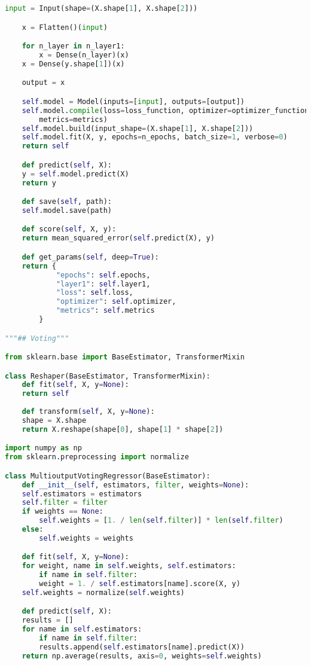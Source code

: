 \begin{lstlisting}[label=python-listing,caption={Kod źródłowy},language=python]
    input = Input(shape=(X.shape[1], X.shape[2]))

    x = Flatten()(input)

    for n_layer in n_layer1:
        x = Dense(n_layer)(x)
    x = Dense(y.shape[1])(x)

    output = x

    self.model = Model(inputs=[input], outputs=[output])
    self.model.compile(loss=loss_function, optimizer=optimizer_function, 
        metrics=metrics) 
    self.model.build(input_shape=(X.shape[1], X.shape[2]))
    self.model.fit(X, y, epochs=n_epochs, batch_size=1, verbose=0)
    return self

    def predict(self, X):
    y = self.model.predict(X)
    return y

    def save(self, path):
    self.model.save(path)

    def score(self, X, y):
    return mean_squared_error(self.predict(X), y)

    def get_params(self, deep=True):
    return {
            "epochs": self.epochs,
            "layer1": self.layer1,
            "loss": self.loss,
            "optimizer": self.optimizer,
            "metrics": self.metrics
        }

"""## Voting"""

from sklearn.base import BaseEstimator, TransformerMixin

class Reshaper(BaseEstimator, TransformerMixin):
    def fit(self, X, y=None):
    return self
    
    def transform(self, X, y=None):
    shape = X.shape
    return X.reshape(shape[0], shape[1] * shape[2])

import numpy as np
from sklearn.preprocessing import normalize

class MultioutputVotingRegressor(BaseEstimator):
    def __init__(self, estimators, filter, weights=None):
    self.estimators = estimators
    self.filter = filter
    if weights == None:
        self.weights = [1. / len(self.filter)] * len(self.filter)
    else:
        self.weights = weights

    def fit(self, X, y=None):
    for weight, name in self.weights, self.estimators:
        if name in self.filter:
        weight = 1. / self.estimators[name].score(X, y)
    self.weights = normalize(self.weights)

    def predict(self, X):
    results = []
    for name in self.estimators:
        if name in self.filter:
        results.append(self.estimators[name].predict(X))
    return np.average(results, axis=0, weights=self.weights)
    

\end{lstlisting}
